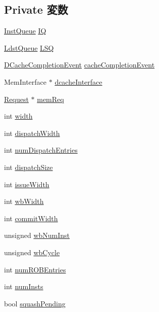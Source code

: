 \subsection*{Private 変数}
\begin{DoxyCompactItemize}
\item 
\hyperlink{classBackEnd_1_1InstQueue}{InstQueue} \hyperlink{classBackEnd_a9f8da5ee0decabae62161ec4c1738952}{IQ}
\item 
\hyperlink{classBackEnd_a4c90230ea80fdcedea6e4fb9b43009cd}{LdstQueue} \hyperlink{classBackEnd_a2d033f80e55d1123d747d40f026042aa}{LSQ}
\item 
\hyperlink{classBackEnd_1_1DCacheCompletionEvent}{DCacheCompletionEvent} \hyperlink{classBackEnd_a08f9ddeb55a0840fc2f9d8f4c5e7a9fc}{cacheCompletionEvent}
\item 
MemInterface $\ast$ \hyperlink{classBackEnd_a22dc8294eecb144fbdd951d2e32e9330}{dcacheInterface}
\item 
\hyperlink{classRequest}{Request} $\ast$ \hyperlink{classBackEnd_aeb76c16c8ed66ba50e2c29989814616d}{memReq}
\item 
int \hyperlink{classBackEnd_a2474a5474cbff19523a51eb1de01cda4}{width}
\item 
int \hyperlink{classBackEnd_aa304d4c426ea2bba52be0a3c0b9811e3}{dispatchWidth}
\item 
int \hyperlink{classBackEnd_a10a1f0f6ff8acbb26f4c308a502c6141}{numDispatchEntries}
\item 
int \hyperlink{classBackEnd_a32343e1e9e56c17bb868f861f9b8927d}{dispatchSize}
\item 
int \hyperlink{classBackEnd_a171bac1210be84c8811563ab35209fce}{issueWidth}
\item 
int \hyperlink{classBackEnd_a20d3086e6bcdc826d99143ac7c9b23a4}{wbWidth}
\item 
int \hyperlink{classBackEnd_a328db48cdab1c2a18d8432b647e2785b}{commitWidth}
\item 
unsigned \hyperlink{classBackEnd_a5fa0799bf5569437190dd1eda1d62b7b}{wbNumInst}
\item 
unsigned \hyperlink{classBackEnd_ad2c7b2687f864f2b7359eb393276996f}{wbCycle}
\item 
int \hyperlink{classBackEnd_ae40678133a160367f2207f07975ca0f3}{numROBEntries}
\item 
int \hyperlink{classBackEnd_a358c879c68910efe5300c4515df35b6c}{numInsts}
\item 
bool \hyperlink{classBackEnd_a2aafb6fc593b04986eeed845923a8953}{squashPending}
\item 

\end{DoxyCompactItemize}
